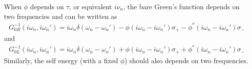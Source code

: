 \documentclass[12pt]{article}
\newcommand{\bea}{\begin{eqnarray}}
\newcommand{\eea}{\end{eqnarray}}
\begin{document}
When $\phi$ depends on $\tau$, or equivalent $i\nu_n$, the bare Green's function depends on two frequencies and can be written as
\bea G_{0R}^{-1}(i\omega_n,i\omega_n')=i\omega_n\delta(\omega_n-\omega_n')-\phi(i\omega_n-i\omega_n')\sigma_+-\phi^*(i\omega_n-i\omega_n')\sigma_- \eea
and
\bea G_{0L}^{-1}(i\omega_n,i\omega_n')=i\omega_n\delta(\omega_n-\omega_n')+\phi(i\omega_n-i\omega_n')\sigma_++\phi^*(i\omega_n-i\omega_n')\sigma_- \eea
Similarly, the self energy (with a fixed $\phi$) should also depends on two frequencies.




\end{document}
